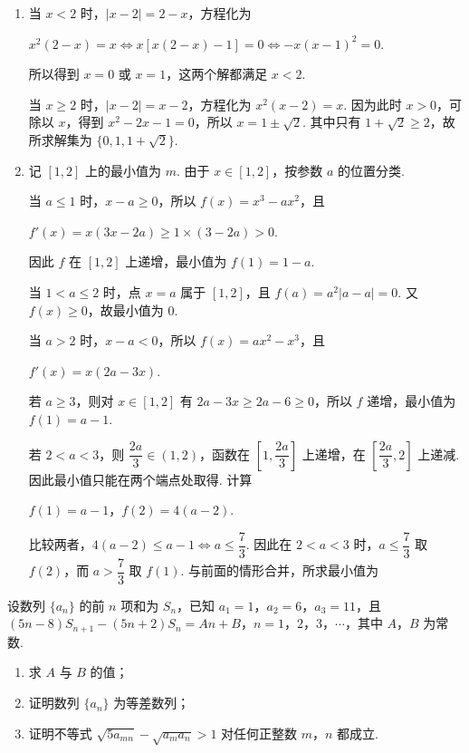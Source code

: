 \begin{solution}
\begin{enumerate}
\item 当 \(x<2\) 时，\(|x-2|=2-x\)，方程化为

\(x^2(2-x)=x\iff x\left[x(2-x)-1\right]=0\iff -x(x-1)^2=0\).

所以得到 \(x=0\) 或 \(x=1\)，这两个解都满足 \(x<2\).

当 \(x\geqslant2\) 时，\(|x-2|=x-2\)，方程化为 \(x^2(x-2)=x\). 因为此时 \(x>0\)，可除以 \(x\)，得到 \(x^2-2x-1=0\)，所以 \(x=1\pm\sqrt{2}\). 其中只有 \(1+\sqrt{2}\geqslant2\)，故所求解集为 \(\{0,1,1+\sqrt{2}\}\).
\item 记 \([1,2]\) 上的最小值为 \(m\). 由于 \(x\in[1,2]\)，按参数 \(a\) 的位置分类.

当 \(a\leqslant1\) 时，\(x-a\geqslant0\)，所以 \(f(x)=x^3-ax^2\)，且

\(f'(x)=x(3x-2a)\geqslant1\times(3-2a)>0\).

因此 \(f\) 在 \([1,2]\) 上递增，最小值为 \(f(1)=1-a\).

当 \(1<a\leqslant2\) 时，点 \(x=a\) 属于 \([1,2]\)，且 \(f(a)=a^2|a-a|=0\). 又 \(f(x)\geqslant0\)，故最小值为 \(0\).

当 \(a>2\) 时，\(x-a<0\)，所以 \(f(x)=ax^2-x^3\)，且

\(f'(x)=x(2a-3x)\).

若 \(a\geqslant3\)，则对 \(x\in[1,2]\) 有 \(2a-3x\geqslant2a-6\geqslant0\)，所以 \(f\) 递增，最小值为 \(f(1)=a-1\).

若 \(2<a<3\)，则 \(\dfrac{2a}{3}\in(1,2)\)，函数在 \(\left[1,\dfrac{2a}{3}\right]\) 上递增，在 \(\left[\dfrac{2a}{3},2\right]\) 上递减. 因此最小值只能在两个端点处取得. 计算

\(f(1)=a-1\)，\(f(2)=4(a-2)\).

比较两者，\(4(a-2)\leqslant a-1\iff a\leqslant\dfrac73\). 因此在 \(2<a<3\) 时，\(a\leqslant\dfrac73\) 取 \(f(2)\)，而 \(a>\dfrac73\) 取 \(f(1)\). 与前面的情形合并，所求最小值为
\end{enumerate}
\end{solution}

\begin{problem}
设数列 \(\{a_{n}\}\) 的前 \(n\) 项和为 \(S_{n}\)，已知 \(a_1 = 1\)，\(a_2 = 6\)，\(a_3 = 11\)，且 \((5n - 8)S_{n+1} - (5n + 2)S_n = An + B\)，\(n = 1\)，\(2\)，\(3\)，\(\cdots\)，其中 \(A\)，\(B\) 为常数.
\begin{enumerate}
\item 求 \(A\) 与 \(B\) 的值；
\item 证明数列 \(\{a_{n}\}\) 为等差数列；
\item 证明不等式 \(\sqrt{5a_{mn}} - \sqrt{a_m a_n} > 1\) 对任何正整数 \(m\)，\(n\) 都成立.
\end{enumerate}
\end{problem}

